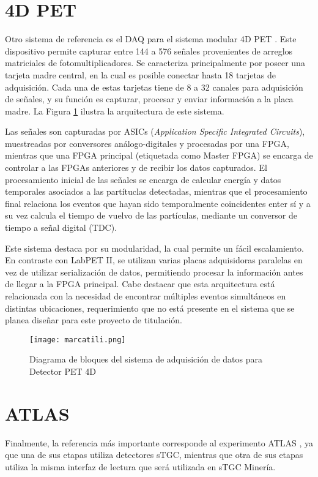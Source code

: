 \newpage
\section{4D PET}
\label{par:4dpet}
	Otro sistema de referencia es el DAQ para el sistema modular 4D PET \cite{Marcatili2011DevelopmentDetector}. Este dispositivo permite capturar entre 144 a 576 señales provenientes de arreglos matriciales de fotomultiplicadores. Se caracteriza principalmente por poseer una tarjeta madre central, en la cual es posible conectar hasta 18 tarjetas de adquisición. Cada una de estas tarjetas tiene de 8 a 32 canales para adquisición de señales, y su función es capturar, procesar y enviar información a la placa madre. La Figura \ref{fig:marcatili} ilustra la arquitectura de este sistema.
		
	Las señales son capturadas por ASICs (\textit{Application Specific Integrated Circuits}), muestreadas por conversores análogo-digitales y procesadas por una FPGA, mientras que una FPGA principal (etiquetada como Master FPGA) se encarga de controlar a las FPGAs anteriores y de recibir los datos capturados. El procesamiento inicial de las señales se encarga de calcular energía y datos temporales asociados a las partítuclas detectadas, mientras que el procesamiento final relaciona los eventos que hayan sido temporalmente coincidentes enter sí y a su vez calcula el tiempo de vuelvo de las partículas, mediante un conversor de tiempo a señal digital (TDC).
	       	
	Este sistema destaca por su modularidad, la cual permite un fácil escalamiento. En contraste con LabPET II, se utilizan varias placas adquisidoras paralelas en vez de utilizar serialización de datos, permitiendo procesar la información antes de llegar a la FPGA principal. Cabe destacar que esta arquitectura está relacionada con la necesidad de encontrar múltiples eventos simultáneos en distintas ubicaciones, requerimiento que no está presente en el sistema que se planea diseñar para este proyecto de titulación. 
	
	\begin{figure}[h]
		\centering
		\texttt{[image: marcatili.png]}
		\caption{Diagrama de bloques del sistema de adquisición de datos para Detector PET 4D \cite{Marcatili2011DevelopmentDetector}}
		\label{fig:marcatili}
	\end{figure}
	
\newpage
\section{ATLAS}
\label{sec:atlas}
	Finalmente, la referencia más importante corresponde al experimento ATLAS \cite{Spieler2012ElectronicsAcquisition}, ya que una de sus etapas utiliza detectores sTGC, mientras que otra de sus etapas utiliza la misma interfaz de lectura que será utilizada en sTGC Minería.

